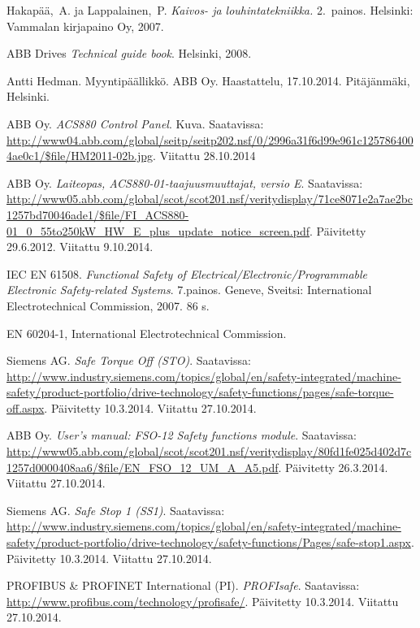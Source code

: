 \documentclass[finnish,12pt,a4paper,pdftex,elec,utf8]{aaltothesis}
\begin{document}
\thesisbibliography
\begin{thebibliography}{99}

Hakapää,\ A. ja Lappalainen,\ P. \textit{Kaivos- ja louhintatekniikka.} 2.\ painos. Helsinki: Vammalan kirjapaino Oy, 2007.

ABB Drives \textit{Technical guide book}. Helsinki, 2008.

Antti Hedman. Myyntipäällikkö. ABB Oy. Haastattelu, 17.10.2014. Pitäjänmäki, Helsinki.

ABB Oy. \textit{ACS880 Control Panel}. Kuva. Saatavissa: \url{http://www04.abb.com/global/seitp/seitp202.nsf/0/2996a31f6d99e961c1257864004ae0c1/$file/HM2011-02b.jpg}. Viitattu 28.10.2014

ABB Oy. \textit{Laiteopas, ACS880-01-taajuusmuuttajat, versio E}. Saatavissa: \url{http://www05.abb.com/global/scot/scot201.nsf/veritydisplay/71ce8071e2a7ae2bc1257bd70046ade1/$file/FI_ACS880-01_0_55to250kW_HW_E_plus_update_notice_screen.pdf}. Päivitetty 29.6.2012. Viitattu 9.10.2014.

IEC EN 61508. \textit{Functional Safety of Electrical/Electronic/Programmable Electronic Safety-related Systems}. 7.painos. Geneve, Sveitsi: International Electrotechnical Commission, 2007. 86 s.

EN 60204-1, International Electrotechnical Commission.

Siemens AG. \textit{Safe Torque Off (STO)}. Saatavissa: \url{http://www.industry.siemens.com/topics/global/en/safety-integrated/machine-safety/product-portfolio/drive-technology/safety-functions/pages/safe-torque-off.aspx}. Päivitetty 10.3.2014. Viitattu 27.10.2014.

 ABB Oy. \textit{User's manual: FSO-12 Safety functions module}. Saatavissa: \url{http://www05.abb.com/global/scot/scot201.nsf/veritydisplay/80fd1fe025d402d7c1257d0000408aa6/$file/EN_FSO_12_UM_A_A5.pdf}. Päivitetty 26.3.2014. Viitattu 27.10.2014.

Siemens AG. \textit{Safe Stop 1 (SS1)}. Saatavissa: \url{http://www.industry.siemens.com/topics/global/en/safety-integrated/machine-safety/product-portfolio/drive-technology/safety-functions/Pages/safe-stop1.aspx}. Päivitetty 10.3.2014. Viitattu 27.10.2014.

 PROFIBUS \& PROFINET International (PI). \textit{PROFIsafe}. Saatavissa: \url{http://www.profibus.com/technology/profisafe/}. Päivitetty 10.3.2014. Viitattu 27.10.2014.


\end{thebibliography}
\end{document}
